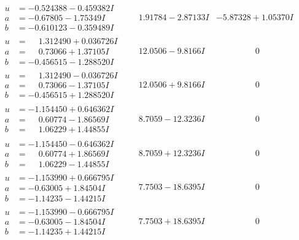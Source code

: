 \documentclass[1p]{elsarticle_modified}
\theoremstyle{definition}
\begin{document}
$$\begin{array}{c|c|c}
\begin{aligned}
u &= -0.524388 - 0.459382 I \\
a &= -0.67805 - 1.75349 I \\
b &= -0.610123 - 0.359489 I\end{aligned}
 & \phantom{-}1.91784 - 2.87133 I & -5.87328 + 1.05370 I \\ \hline\begin{aligned}
u &= \phantom{-}1.312490 + 0.036726 I \\
a &= \phantom{-}0.73066 + 1.37105 I \\
b &= -0.456515 - 1.288520 I\end{aligned}
 & \phantom{-}12.0506 - 9.8166 I & \phantom{-0.000000 } 0 \\ \hline\begin{aligned}
u &= \phantom{-}1.312490 - 0.036726 I \\
a &= \phantom{-}0.73066 - 1.37105 I \\
b &= -0.456515 + 1.288520 I\end{aligned}
 & \phantom{-}12.0506 + 9.8166 I & \phantom{-0.000000 } 0 \\ \hline\begin{aligned}
u &= -1.154450 + 0.646362 I \\
a &= \phantom{-}0.60774 - 1.86569 I \\
b &= \phantom{-}1.06229 + 1.44855 I\end{aligned}
 & \phantom{-}8.7059 - 12.3236 I & \phantom{-0.000000 } 0 \\ \hline\begin{aligned}
u &= -1.154450 - 0.646362 I \\
a &= \phantom{-}0.60774 + 1.86569 I \\
b &= \phantom{-}1.06229 - 1.44855 I\end{aligned}
 & \phantom{-}8.7059 + 12.3236 I & \phantom{-0.000000 } 0 \\ \hline\begin{aligned}
u &= -1.153990 + 0.666795 I \\
a &= -0.63005 + 1.84504 I \\
b &= -1.14235 - 1.44215 I\end{aligned}
 & \phantom{-}7.7503 - 18.6395 I & \phantom{-0.000000 } 0 \\ \hline\begin{aligned}
u &= -1.153990 - 0.666795 I \\
a &= -0.63005 - 1.84504 I \\
b &= -1.14235 + 1.44215 I\end{aligned}
 & \phantom{-}7.7503 + 18.6395 I & \phantom{-0.000000 } 0 \\ \hline\begin{aligned}

\end{aligned}
\end{array}$$
\end{document}

